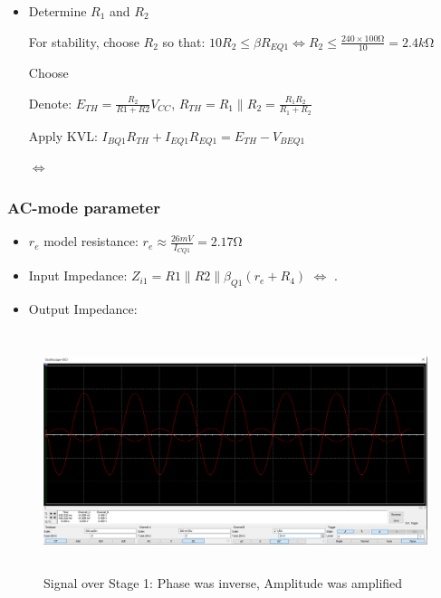 \documentclass[twoside, a4paper, leqno]{article}
\begin{document}
\begin{itemize}
			\item Determine $R_1$ and $R_2$
			
				For stability, choose $R_2$ so that: $10R_2 \leq \beta R_{EQ1} \Leftrightarrow R_2 \leq \frac{240\times100\si{\ohm}}{10} = 2.4k\si{\ohm}$
				
				Choose 
				
				Denote: $E_{TH} = \frac{R_2}{R1+R2}V_{CC}$, $R_{TH} = R_1\parallel R_2 = \frac{R_1R_2}{R_1+R_2}$
				
				Apply KVL: $I_{BQ1}R_{TH} + I_{EQ1}R_{EQ1} = E_{TH} - V_{BEQ1}$
				
				$\Leftrightarrow$ 		
		\end{itemize}
					
		\subsubsection*{AC-mode parameter}
		\begin{itemize}
			\item $r_e$ model resistance: $r_e \approx \frac{26mV}{I_{CQ1}} = 2.17\si{\ohm}$
			
			\item Input Impedance: $Z_{i1} = R1\parallel R2\parallel \beta_{Q1}(r_e + R_4)$ $\Leftrightarrow$ .
			
			\item Output Impedance: 
			
		\end{itemize}
					
		\begin{center}
			\begin{figure}[htp]
				\begin{center}
					\includegraphics[height= 7cm]{figure/stage1_signal.png}
				\end{center}
				\caption{Signal over Stage 1: Phase was inverse, Amplitude was amplified}
				\label{refFigure4}
			\end{figure}	
		\end{center}
								
\end{document}
